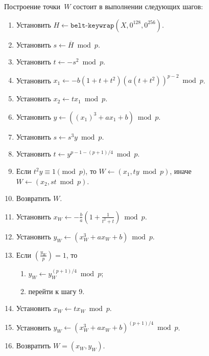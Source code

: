 Построение точки~$W$ состоит в выполнении следующих шагов:
\begin{enumerate}
\item
Установить $H\leftarrow \texttt{belt-keywrap}(X,0^{128},0^{256})$.
 
\item
Установить
$s\leftarrow \overline{H}\bmod p$.

\item
Установить
$t\leftarrow -s^2\bmod p$.

\item
Установить
$x_1\leftarrow -b(1+t+t^2)(a(t+t^2))^{p-2}\bmod p$.
%

\item
Установить
$x_2\leftarrow t x_1 \bmod p$.

\item
Установить
$y\leftarrow \left((x_1)^3+a x_1 + b\right)\bmod p$.

\item
Установить
$s\leftarrow s^3 y\bmod p$.

\item
Установить
$t\leftarrow y^{p-1-(p+1)/4}\bmod p$.

\item
Если $t^2 y\equiv 1\pmod{p}$, 
то $W\leftarrow(x_1,ty\bmod p)$,
иначе $W\leftarrow (x_2,st\bmod p)$.

\item
Возвратить $W$.


\item
Установить
$x_W\leftarrow -\frac{b}{a}\left(1+\frac{1}{t^2+t}\right)\bmod p$.

\item
Установить 
$y_W\leftarrow (x_W^3+ax_W+b)\bmod p$.

\item
Если $\left(\frac{y_W}{p}\right)=1$, то 
\begin{enumerate}
\item
$y_W\leftarrow y_W^{(p+1)/4}\bmod p$;
\item
перейти к шагу 9.
\end{enumerate}
\item
Установить
$x_W\leftarrow t x_W\bmod p$.

\item
Установить
$y_W\leftarrow (x_W^3+ax_W+b)^{(p+1)/4}\bmod p$.

\item
Возвратить $W=(x_W,y_W)$.
\fi
\end{enumerate}

